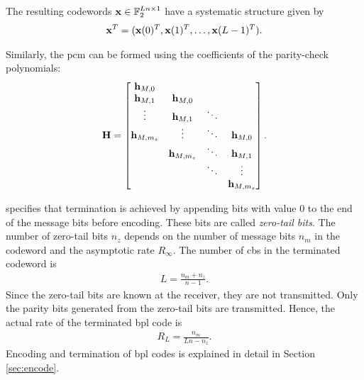 The resulting codewords $\mathbf{x}\in\mathbb{F}_2^{Ln\times 1}$ have a systematic structure given by \begin{align}\mathbf{x}^T=(\mathbf{x}(0)^T,\mathbf{x}(1)^T,\dots,\mathbf{x}(L-1)^T).\end{align}

Similarly, the \ac{pcm} can be formed using the coefficients of the parity-check polynomials:
\begin{align}\label{eq:bpl_pcm}
\mathbf{H}=
\begin{bmatrix}
\mathbf{h}_{M,0}\\
\mathbf{h}_{M,1} &\mathbf{h}_{M,0}\\
\vdots &\mathbf{h}_{M,1} &\ddots\\
\mathbf{h}_{M,m_s} &\vdots &\ddots &\mathbf{h}_{M,0}\\
&\mathbf{h}_{M,m_s} &\ddots &\mathbf{h}_{M,1}\\
& &\ddots &\vdots\\
& & &\mathbf{h}_{M,m_s}
\end{bmatrix}.
\end{align}

\cite{Bpl} specifies that termination is achieved by appending bits with value $0$ to the end of the message bits before encoding. These bits are called \emph{zero-tail bits}. The number of zero-tail bits $n_z$ depends on the number of message bits $n_m$ in the codeword and the asymptotic rate $R_\infty$. The number of \acp{cb} in the terminated codeword is \begin{align}L=\frac{n_m+n_z}{n-1}.\end{align} Since the zero-tail bits are known at the receiver, they are not transmitted. Only the parity bits generated from the zero-tail bits are transmitted. Hence, the actual rate of the terminated \ac{bpl} code is
\begin{align}\label{eq:rate_term}
R_L=\frac{n_m}{Ln-n_z}.
\end{align}
Encoding and termination of \ac{bpl} codes is explained in detail in Section \ref{sec:encode}.

